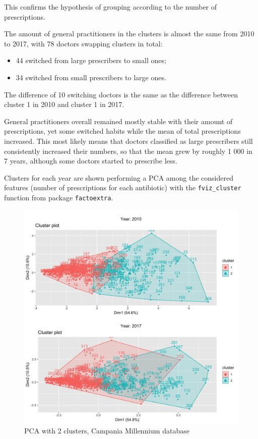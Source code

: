 This confirms the hypothesis of grouping according to the number of prescriptions.

The amount of general practitioners in the clusters is almost the same from 2010 to 2017, with 78 doctors swapping clusters in total:
\begin{itemize}
	\item 44 switched from large prescribers to small ones;
	\item 34 switched from small prescribers to large ones.
\end{itemize}
The difference of 10 switching doctors is the same as the difference between cluster 1 in 2010 and cluster 1 in 2017.

General practitioners overall remained mostly stable with their amount of prescriptions, yet some switched habits while the mean of total prescriptions increased. This most likely means that doctors classified as large prescribers still consistently increased their numbers, so that the mean grew by roughly 1 000 in 7 years, although some doctors started to prescribe less.

Clusters for each year are shown performing a PCA among the considered features (number of prescriptions for each antibiotic) with the \texttt{fviz\_cluster} function from package \texttt{factoextra}. 

\begin{figure}[h]
	\centering
	\includegraphics[scale=0.18]{../k-means/clusters-2.png}
	\caption{\small PCA with 2 clusters, Campania Millennium database}
\end{figure}

